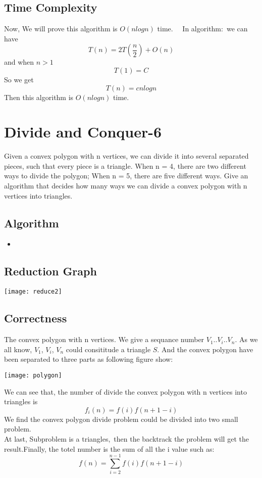 \documentclass{article}
\newcommand{\pythonscript}[2]{
\begin{itemize}
\item[]
\end{itemize}
}
\begin{document}
    \subsection{Time Complexity}
    Now, We will prove this algorithm is $O(n log n)$ time.  
    In algorithm: we can have $$T(n)=2T(\frac{n}{2})+ O(n)$$ and when $n>1$ $$T(1)=C$$ So we get $$T(n)=cn log n$$ 
    Then this algorithm is $O(n log n)$ time.

\section{Divide and Conquer-6}
Given a convex polygon with n vertices, we can divide it into several separated pieces, such that every piece is a triangle. When n = 4, there are two different ways to divide the polygon; When n = 5, there are five different ways.
Give an algorithm that decides how many ways we can divide a convex polygon with n vertices into triangles.
    \subsection{Algorithm}
        \pythonscript{DivideConvexPolygon}{Divide a convex polygon with n vertices into triangles}
    \subsection{Reduction Graph}
        \begin{center}
            \texttt{[image: reduce2]}
        \end{center}
    \subsection{Correctness}
    The convex polygon with n vertices. We give a sequance number $V_1..V_i..V_n$. As we all know, $V_1$, $V_i$, $V_n$ could consititude a triangle $S$. And the convex polygon have been separated to three parts as following figure show: 
    \begin{center}
    \texttt{[image: polygon]}
    \end{center}
    We can see that, the number of divide the convex polygon with n vertices into triangles is  $$f_i(n)=f(i)f(n+1-i)$$ We find the convex polygon divide problem could be divided into two small problem. \\
    At last, Subproblem is a triangles, then the backtrack the problem will get the result.Finally, the totel number is the sum of all the i value such as: $$f(n)=\sum_{i=2}^{n-1}f(i)f(n+1-i)$$
\end{document}

